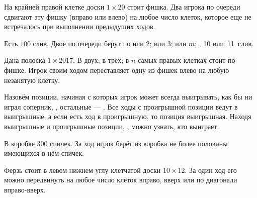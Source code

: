 \documentclass[11pt,a4paper]{article}
\begin{document}
\vspace*{1truemm}

 На крайней правой клетке доски $1\times 20$ стоит фишка.
Два игрока по очереди сдвигают эту фишку (вправо или влево)
на любое число клеток, которое еще не встречалось при
выполнении предыдущих ходов.


Есть $100$ слив. Двое по очереди берут по
 или 2;
 или 3;
 или $m$;
, 10 или~11~слив.



Дана полоска $1\times2017$.
 В двух;
 в трёх;
 в $n$ самых правых клетках стоит по фишке.
Игрок своим ходом переставляет одну из фишек влево
на любую незанятую клетку.

\vspace*{.5mm}
{\small
Назовём позиции, начиная с которых игрок может всегда выигрывать, как бы ни играл соперник,
, остальные --- .
Все ходы с проигрышной позиции ведут в выигрышные, а если есть ход в проигрышную, то позиция выигрышная.
Находя выигрышные и проигрышные позиции,
,
можно узнать, кто выиграет. %
}

\vspace*{1mm}

В коробке 300 спичек. %
За ход игрок берёт из коробка не более половины имеющихся в нём спичек.


Ферзь стоит в левом нижнем углу клетчатой доски $10\times12$. За один ход его
можно передвинуть на любое число клеток вправо, вверх или по диагонали
 вправо-вверх. %
\end{document}
